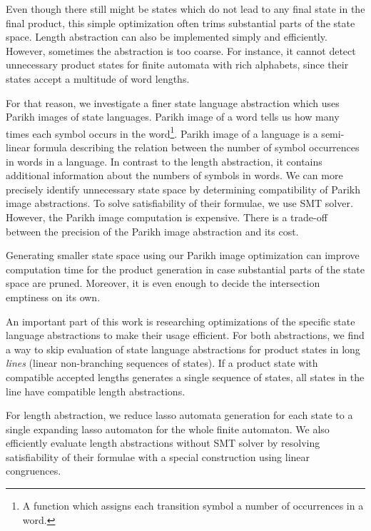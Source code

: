 Even though there still might be states which do not lead to any final state in the final product, this simple optimization often trims substantial parts of the state space. Length abstraction can also be implemented simply and efficiently. However, sometimes the abstraction is too coarse. For instance, it cannot detect unnecessary product states for finite automata with rich alphabets, since their states accept a multitude of word lengths.


For that reason, we investigate a finer state language abstraction which uses Parikh images of state languages. Parikh image of a word tells us how many times each symbol occurs in the word\footnote{A function which assigns each transition symbol a number of occurrences in a word.}. Parikh image of a language is a semi-linear formula describing the relation between the number of symbol occurrences in words in a language. In contrast to the length abstraction, it contains additional information about the numbers of symbols in words. We can more precisely identify unnecessary state space by determining compatibility of Parikh image abstractions. To solve satisfiability of their formulae, we use SMT solver. However, the Parikh image computation is expensive. There is a trade-off between the precision of the Parikh image abstraction and its cost.

Generating smaller state space using our Parikh image optimization can improve computation time for the product generation in case substantial parts of the state space are pruned. Moreover, it is even enough to decide the intersection emptiness on its own.


An important part of this work is researching optimizations of the specific state language abstractions to make their usage efficient. For both abstractions, we find a way to skip evaluation of state language abstractions for product states in long \emph{lines} (linear non-branching sequences of states). If a product state with compatible accepted lengths generates a single sequence of states, all states in the line have compatible length abstractions.

For length abstraction, we reduce lasso automata generation for each state to a single expanding lasso automaton for the whole finite automaton. We also efficiently evaluate length abstractions without SMT solver by resolving satisfiability of their formulae with a special construction using linear congruences.


